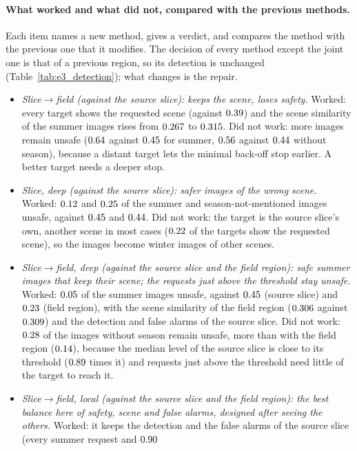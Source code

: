 \documentclass{article}
\theoremstyle{plain}
\theoremstyle{remark}
\begin{document}
\paragraph{What worked and what did not, compared with the previous methods.}
Each item names a new method, gives a verdict, and compares the method with the previous one that it modifies. The decision of
every method except the joint one is that of a previous region, so its detection is unchanged (Table~\ref{tab:e3_detection}); what
changes is the repair.
\begin{itemize}
\item \emph{Slice$\to$field (against the source slice): keeps the scene, loses safety.} Worked: every target shows the requested scene
(against $0.39$) and the scene similarity of the summer images rises from $0.267$ to $0.315$. Did not work: more
images remain unsafe ($0.64$ against $0.45$ for summer, $0.56$ against $0.44$ without season),
because a distant target lets the minimal back-off stop earlier. A better target needs a deeper stop.
\item \emph{Slice, deep (against the source slice): safer images of the wrong scene.} Worked: $0.12$ and $0.25$
of the summer and season-not-mentioned images unsafe, against $0.45$ and $0.44$. Did not work: the target is the
source slice's own, another scene in most cases ($0.22$ of the targets show the requested scene), so the images become winter
images of other scenes.
\item \emph{Slice$\to$field, deep (against the source slice and the field region): safe summer images that keep their scene; the
requests just above the threshold stay unsafe.} Worked: $0.05$ of the summer images unsafe, against $0.45$ (source slice)
and $0.23$ (field region), with the scene similarity of the field region ($0.306$ against $0.309$) and the
detection and false alarms of the source slice. Did not work: $0.28$ of the images without season remain unsafe, more
than with the field region ($0.14$), because the median level of the source slice is close to its threshold
($0.89$ times it) and requests just above the threshold need little of the target to reach it.
\item \emph{Slice$\to$field, local (against the source slice and the field region): the best balance here of safety, scene and
false alarms, designed after seeing the others.} Worked: it keeps the detection and the false alarms of the source slice (every summer request and $0.90$

\end{itemize}
\end{document}
